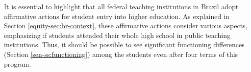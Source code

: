 It is essential to highlight that all federal teaching institutions in Brazil adopt affirmative actions for student entry into higher education. As explained in Section \ref{equity-sec:br-context}, these affirmative actions consider various aspects, emphasizing if students attended their whole high school in public teaching institutions. Thus, it should be possible to see significant functioning differences (Section \ref{sen-ss:functioning}) among the students even after four terms of this program.

                

        

        
